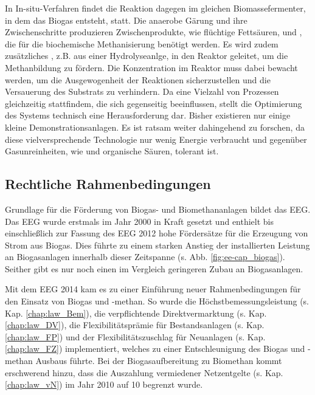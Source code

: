 In In-situ-Verfahren findet die Reaktion dagegen im gleichen Biomassefermenter, in dem das Biogas entsteht, statt. Die anaerobe Gärung und ihre Zwischenschritte produzieren Zwischenprodukte, wie flüchtige Fettsäuren,  und , die für die biochemische Methanisierung benötigt werden. Es wird zudem zusätzliches , z.B. aus einer Hydrolyseanlge, in den  Reaktor geleitet, um die Methanbildung zu fördern. Die  Konzentration im Reaktor muss dabei bewacht werden, um die Ausgewogenheit der Reaktionen sicherzustellen und die Versauerung des Substrats zu verhindern. Da eine Vielzahl von Prozessen gleichzeitig stattfindem, die sich gegenseitig beeinflussen, stellt die Optimierung des Systems technisch eine Herausforderung dar. Bisher existieren nur einige kleine Demonstrationsanlagen. Es ist ratsam weiter dahingehend zu forschen, da diese vielversprechende Technologie nur wenig Energie verbraucht und gegenüber Gasunreinheiten, wie  und organische Säuren, tolerant ist. 
\parencite{AONC2019} \parencite{KGKK2019} \parencite{VRM2019}


\subsection{Rechtliche Rahmenbedingungen}\label{chap:law_theo}

Grundlage für die Förderung von Biogas- und Biomethananlagen bildet das \gls{EEG}. Das \gls{EEG} wurde erstmals im Jahr 2000 in Kraft gesetzt und enthielt bis einschließlich zur Fassung des \gls{EEG} \SI{2012}{\relax} hohe Fördersätze für die Erzeugung von Strom aus Biogas. Dies führte zu einem starken Anstieg der installierten Leistung an Biogasanlagen innerhalb dieser Zeitspanne (s. Abb. \ref{fig:ee-cap_biogas}). Seither gibt es nur noch einen im Vergleich geringeren Zubau an Biogasanlagen. \parencite{DanielGromke2019}\smallskip

Mit dem \gls{EEG} \SI{2014}{\relax} kam es zu einer Einführung neuer Rahmenbedingungen für den Einsatz von Biogas und -methan. So wurde die Höchstbemessungsleistung (s. Kap. \ref{chap:law_Bem}), die verpflichtende Direktvermarktung (s. Kap. \ref{chap:law_DV}), die Flexibilitätsprämie für Bestandsanlagen (s. Kap. \ref{chap:law_FP}) und der Flexibilitätszuschlag für Neuanlagen (s. Kap. \ref{chap:law_FZ}) implementiert, welches zu einer Entschleunigung des Biogas und -methan Ausbaus führte. Bei der Biogasaufbereitung zu Biomethan kommt erschwerend hinzu, dass die Auszahlung vermiedener Netzentgelte (s. Kap. \ref{chap:law_vN}) im Jahr \SI{2010}{\relax} auf \SI{10}{\Jahre} begrenzt wurde. \parencite{BDEW2019a}


